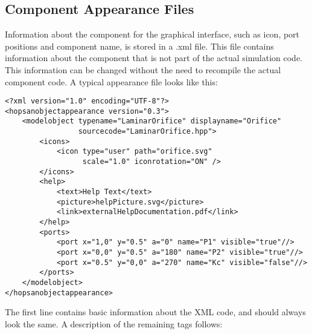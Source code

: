 \documentclass[a4paper,pdftex]{article}
\begin{document}
\subsection*{Component Appearance Files}
Information about the component for the graphical interface, such as icon, port positions and component name, is stored in a .xml file. This file contains information about the component that is not part of the actual simulation code. This information can be changed without the need to recompile the actual component code. A typical appearance file looks like this:

\begin{minipage}{\linewidth}
\begin{lstlisting}[basicstyle=\small\ttfamily]
<?xml version="1.0" encoding="UTF-8"?>
<hopsanobjectappearance version="0.3">
    <modelobject typename="LaminarOrifice" displayname="Orifice" 
                 sourcecode="LaminarOrifice.hpp">
        <icons>
            <icon type="user" path="orifice.svg" 
                  scale="1.0" iconrotation="ON" />
        </icons>
        <help>
            <text>Help Text</text>
            <picture>helpPicture.svg</picture>
            <link>externalHelpDocumentation.pdf</link>
        </help>
        <ports>
            <port x="1,0" y="0.5" a="0" name="P1" visible="true"//>
            <port x="0,0" y="0.5" a="180" name="P2" visible="true"//>
            <port x="0.5" y="0,0" a="270" name="Kc" visible="false"//>
        </ports>
    </modelobject>
</hopsanobjectappearance>
\end{lstlisting}
\end{minipage}

The first line contains basic information about the XML code, and should always look the same. 
A description of the remaining tags follows:
\end{document}
